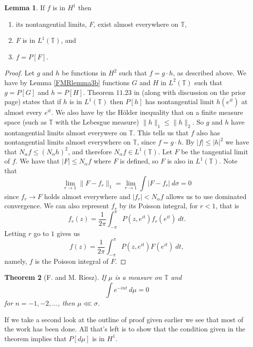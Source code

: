\documentclass[a4paper,12pt,twoside,BCOR=10mm]{scrbook}
\newtheorem{theorem}{Theorem}[section]
\theoremstyle{definition}
\theoremstyle{definition}
\newtheorem{lemma}[theorem]{Lemma}
\theoremstyle{definition}
\begin{document}
\begin{lemma}
\label{FMRlemma2}
If $f$ is in $H^1$ then
\begin{enumerate}
\item \label{p1}
its nontangential limits, $F$, exist almost everywhere on $\mathbb{T}$,
\item \label{p2}
$F$ is in $L^1(\mathbb{T})$, and
\item \label{p3}
$f = P[F]$.
\end{enumerate}
\end{lemma}
\begin{proof}
Let $g$ and $h$ be functions in $H^2$ such that $f = g \cdot h$, as described above.
We have by Lemma \ref{FMRlemma3b} functions $G$ and $H$ in $L^2(\mathbb{T})$ such that $g = P[G]$ and $h = P[H]$.
Theorem $11.23$ in \citep{rudin2} (along with discussion on the prior page) states that if $h$ is in $L^1(\mathbb{T})$ then $P[h]$ has nontangential limit $h(e^{it})$ at almost every $e^{it}$.
We also have by the Hölder inequality that on a finite measure space (such as $\mathbb{T}$ with the Lebesgue measure) $\|h\|_1 \leq \|h\|_2$.
So $g$ and $h$ have nontangential limits almost everywere on $\mathbb{T}$.
This tells us that $f$ also has nontangential limits almost everywhere on $\mathbb{T}$, since $f = g \cdot h$.
By $|f| \leq |h|^2$ we have that $N_{\alpha}f \leq (N_{\alpha}h)^2$, and therefore $N_{\alpha}f \in L^1(\mathbb{T})$.
Let $F$ be the tangential limit of $f$.
We have that $|F| \leq N_{\alpha}f$ where $F$ is defined, so $F$ is also in $L^1(\mathbb{T})$.
Note that
\[
	\lim_{r \rightarrow 1} \|F - f_r\|_1 = \lim_{r \rightarrow 1} \int |F - f_r|\ d\sigma = 0
\]
since $f_r \rightarrow F$ holds almost everywhere and $|f_r| < N_{\alpha}f$ allows us to use dominated convergence.
We can also represent $f_r$ by its Poisson integral, for $r < 1$, that is
\[
	f_r(z) = \frac{1}{2\pi} \int_{-\pi}^{\pi} P(z, e^{it})f_r(e^{it})\ dt.
\]
Letting $r$ go to $1$ gives us
\[
	f(z) = \frac{1}{2\pi} \int_{-\pi}^{\pi} P(z, e^{it})F(e^{it})\ dt,
\]
namely, $f$ is the Poisson integral of $F$.
\end{proof}
\begin{theorem}[F. and M. Riesz]
If $\mu$ is a measure on $\mathbb{T}$ and
\[
	\int e^{-int}\ d\mu = 0
\]
for $n = -1, -2, ...$, then $\mu \lll \sigma$.
\end{theorem}
If we take a second look at the outline of proof given earlier we see that most of the work has been done.
All that's left is to show that the condition given in the theorem implies that $P[d\mu]$ is in $H^1$.
\end{document}
